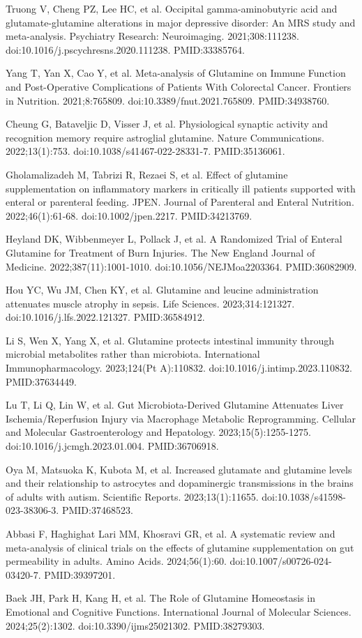 \documentclass[11pt,oneside]{book}
\newcommand{\reff}[2]{\par\hangindent=7mm\hangafter=1\noindent[#1]\hspace{2mm}#2\par}
\begin{document}
\reff{23}{Truong V, Cheng PZ, Lee HC, et al. Occipital gamma-aminobutyric acid and glutamate-glutamine alterations in major depressive disorder: An MRS study and meta-analysis. Psychiatry Research: Neuroimaging. 2021;308:111238. doi:10.1016/j.pscychresns.2020.111238. PMID:33385764.}
\reff{24}{Yang T, Yan X, Cao Y, et al. Meta-analysis of Glutamine on Immune Function and Post-Operative Complications of Patients With Colorectal Cancer. Frontiers in Nutrition. 2021;8:765809. doi:10.3389/fnut.2021.765809. PMID:34938760.}
\reff{25}{Cheung G, Bataveljic D, Visser J, et al. Physiological synaptic activity and recognition memory require astroglial glutamine. Nature Communications. 2022;13(1):753. doi:10.1038/s41467-022-28331-7. PMID:35136061.}
\reff{26}{Gholamalizadeh M, Tabrizi R, Rezaei S, et al. Effect of glutamine supplementation on inflammatory markers in critically ill patients supported with enteral or parenteral feeding. JPEN. Journal of Parenteral and Enteral Nutrition. 2022;46(1):61-68. doi:10.1002/jpen.2217. PMID:34213769.}
\reff{27}{Heyland DK, Wibbenmeyer L, Pollack J, et al. A Randomized Trial of Enteral Glutamine for Treatment of Burn Injuries. The New England Journal of Medicine. 2022;387(11):1001-1010. doi:10.1056/NEJMoa2203364. PMID:36082909.}
\reff{28}{Hou YC, Wu JM, Chen KY, et al. Glutamine and leucine administration attenuates muscle atrophy in sepsis. Life Sciences. 2023;314:121327. doi:10.1016/j.lfs.2022.121327. PMID:36584912.}
\reff{29}{Li S, Wen X, Yang X, et al. Glutamine protects intestinal immunity through microbial metabolites rather than microbiota. International Immunopharmacology. 2023;124(Pt A):110832. doi:10.1016/j.intimp.2023.110832. PMID:37634449.}
\reff{30}{Lu T, Li Q, Lin W, et al. Gut Microbiota-Derived Glutamine Attenuates Liver Ischemia/Reperfusion Injury via Macrophage Metabolic Reprogramming. Cellular and Molecular Gastroenterology and Hepatology. 2023;15(5):1255-1275. doi:10.1016/j.jcmgh.2023.01.004. PMID:36706918.}
\reff{31}{Oya M, Matsuoka K, Kubota M, et al. Increased glutamate and glutamine levels and their relationship to astrocytes and dopaminergic transmissions in the brains of adults with autism. Scientific Reports. 2023;13(1):11655. doi:10.1038/s41598-023-38306-3. PMID:37468523.}
\reff{32}{Abbasi F, Haghighat Lari MM, Khosravi GR, et al. A systematic review and meta-analysis of clinical trials on the effects of glutamine supplementation on gut permeability in adults. Amino Acids. 2024;56(1):60. doi:10.1007/s00726-024-03420-7. PMID:39397201.}
\reff{33}{Baek JH, Park H, Kang H, et al. The Role of Glutamine Homeostasis in Emotional and Cognitive Functions. International Journal of Molecular Sciences. 2024;25(2):1302. doi:10.3390/ijms25021302. PMID:38279303.}
\end{document}
